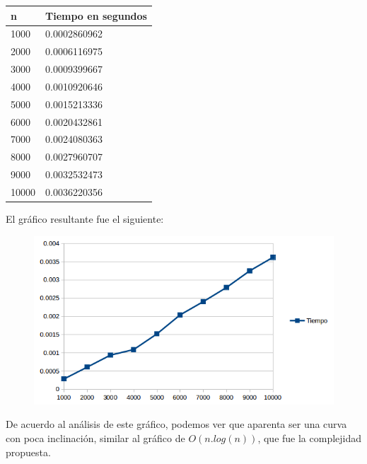 \begin{table}[htb]
\centering
\begin{tabular}[c]{|l|l|}

		\hline
n & Tiempo en segundos\\
		\hline
1000	&	0.0002860962\\
		\hline
2000	&	0.0006116975\\
		\hline
3000	&	0.0009399667\\
		\hline
4000	&	0.0010920646\\
		\hline
5000	&	0.0015213336\\
		\hline
6000	&	0.0020432861\\
		\hline
7000	&	0.0024080363\\
		\hline
8000	&	0.0027960707\\
		\hline
9000	&	0.0032532473\\
		\hline
10000	&	0.0036220356\\
		\hline
		
	\end{tabular}
\end{table}

El gr\'afico resultante fue el siguiente:

 \begin{figure}[h!]
   \begin{center}
 	\includegraphics{imagenes/ej1/Mediciones/Grafico1.png}
   \end{center}
 \end{figure}

De acuerdo al an\'alisis de este gr\'afico, podemos ver que aparenta ser una curva con poca inclinaci\'on, similar al gr\'afico de $O( n.log(n) )$, que fue la complejidad propuesta.

